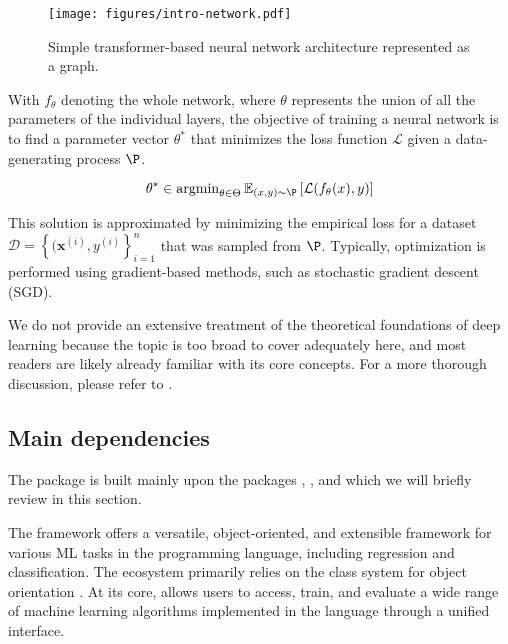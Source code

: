 \documentclass[article]{jss}
\theoremstyle{definition}
\begin{document}
\begin{figure}[h]
    \centering
    \texttt{[image: figures/intro-network.pdf]}
    \caption{Simple transformer-based neural network architecture represented as a graph.}
    \label{fig:intro-network}
\end{figure}

With $f_\theta$ denoting the whole network, where $\theta$ represents the union of all the parameters of the individual layers, the objective of training a neural network is to find a parameter vector $\theta^*$ that minimizes the loss function $\mathcal{L}$ given a data-generating process $\P$.

\begin{equation}
\theta^* \in \operatorname{argmin}_{\theta \in \Theta} \mathbb{E}_{(x, y) \sim \P} \left[ \mathcal{L}(f_{\theta}(x), y) \right]
\end{equation}

This solution is approximated by minimizing the empirical loss for a dataset $\mathcal{D} = \left\{ (\mathbf{x}^{(i)}, y^{(i)} \right\}_{i=1}^n$ that was sampled from $\P$.
Typically, optimization is performed using gradient-based methods, such as stochastic gradient descent (SGD).

We do not provide an extensive treatment of the theoretical foundations of deep learning because the topic is too broad to cover adequately here, and most readers are likely already familiar with its core concepts. For a more thorough discussion, please refer to \cite{bishop2023deep}.

\subsection{Main dependencies}

The  \rlang{} package is built mainly upon the \rlang{} packages  \citep{ref-mlr32019},  \citep{ref-mlr3pipelines2021}, and  \citep{ref-torch2025} which we will briefly review in this section.

The  framework offers a versatile, object-oriented, and extensible framework for various ML tasks in the  programming language, including regression and classification.
The ecosystem primarily relies on the  class system for object orientation \citep{ref-r6chang}.
At its core,  allows users to access, train, and evaluate a wide range of machine learning algorithms implemented in the  language through a unified interface.
\end{document}
